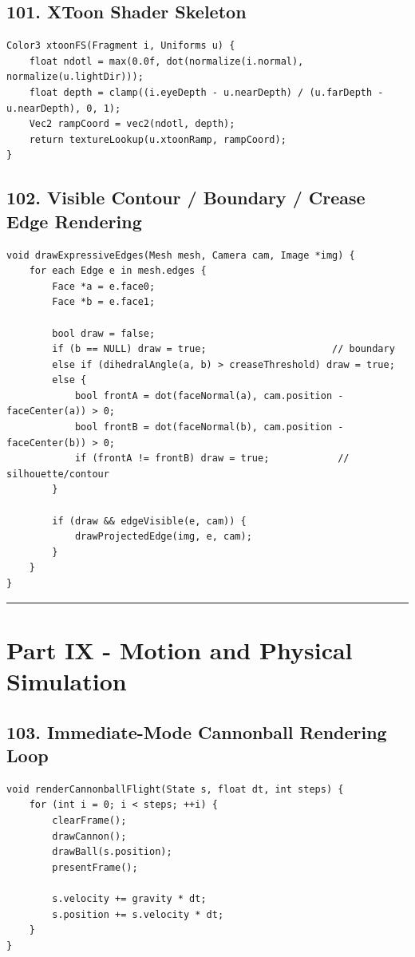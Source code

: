 \documentclass[10pt,letterpaper]{article}
\begin{document}
\subsection{101. XToon Shader Skeleton}

\begin{verbatim}
Color3 xtoonFS(Fragment i, Uniforms u) {
    float ndotl = max(0.0f, dot(normalize(i.normal), normalize(u.lightDir)));
    float depth = clamp((i.eyeDepth - u.nearDepth) / (u.farDepth - u.nearDepth), 0, 1);
    Vec2 rampCoord = vec2(ndotl, depth);
    return textureLookup(u.xtoonRamp, rampCoord);
}
\end{verbatim}

\subsection{102. Visible Contour / Boundary / Crease Edge Rendering}

\begin{verbatim}
void drawExpressiveEdges(Mesh mesh, Camera cam, Image *img) {
    for each Edge e in mesh.edges {
        Face *a = e.face0;
        Face *b = e.face1;

        bool draw = false;
        if (b == NULL) draw = true;                      // boundary
        else if (dihedralAngle(a, b) > creaseThreshold) draw = true;
        else {
            bool frontA = dot(faceNormal(a), cam.position - faceCenter(a)) > 0;
            bool frontB = dot(faceNormal(b), cam.position - faceCenter(b)) > 0;
            if (frontA != frontB) draw = true;            // silhouette/contour
        }

        if (draw && edgeVisible(e, cam)) {
            drawProjectedEdge(img, e, cam);
        }
    }
}
\end{verbatim}

\medskip\hrule\medskip

\clearpage
\section{Part IX - Motion and Physical Simulation}

\subsection{103. Immediate-Mode Cannonball Rendering Loop}

\begin{verbatim}
void renderCannonballFlight(State s, float dt, int steps) {
    for (int i = 0; i < steps; ++i) {
        clearFrame();
        drawCannon();
        drawBall(s.position);
        presentFrame();

        s.velocity += gravity * dt;
        s.position += s.velocity * dt;
    }
}
\end{verbatim}
\end{document}
